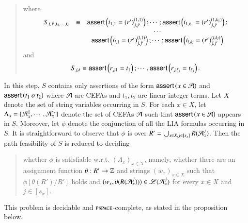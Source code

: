 \begin{quote}
\[\]
where 
\[
\begin{array}{l c c}
S_{j, j', \vec{i_1}, \cdots, \vec{i_l}} & \equiv & \ASSERT{i_{1,1} = (r')^{(1,1)}_{j, j'}}; \cdots; \ASSERT{i_{1,k_1} = (r')^{(1,k_1)}_{j, j'}};\\
& & \cdots\\
 & & \ASSERT{i_{l,1} = (r')^{(l,1)}_{j, j'}}; \cdots; \ASSERT{i_{l,k_l} = (r')^{(l,k_l)}_{j, j'}}
\end{array}
\]
and
\[
\begin{array}{l}
S_{j, \vec{t}} \equiv \ASSERT{r_{j, 1} = t_1}; \cdots, \ASSERT{r_{j, \ell_j} = t_{\ell_j}}.
\end{array}
\]
%
\end{quote}

\medskip
{}%

\smallskip

In this step, $S$ %
contains only assertions of the form $\textsf{assert}\left(x \in \mathcal{A}\right)$ and  $\textsf{assert}\left(t_1\ o\ t_2\right)$  where $\mathcal{A}$ are CEFAs and $t_1, t_2$ are linear integer terms. %
%
Let $X$ denote the set of string variables occurring in $S$.
For each $x \in X$, let $\Lambda_x=\{\mathcal{A}_{x}^1, \cdots, \mathcal{A}_{x}^{s_x}\}$ denote the set of CEFAs $\mathcal{A}$ such that $\textsf{assert}\left(x \in \mathcal{A}\right)$ appears in $S$. 
Moreover, let $\phi$ denote the conjunction of all the LIA formulas occurring in $S$. It is straightforward to observe that $\phi$ is over %
$R'=\bigcup_{x\in X, j \in [s_x]}R(\mathcal{A}_{x}^{j})$. Then the path feasibility of $S$ is reduced to deciding 
\begin{quote}
whether $\phi$ is satisfiable w.r.t. $(\Lambda_x)_{x \in X}$, namely,  %
%	
whether %
there are an assignment function $\theta: R' \rightarrow \mathbb{Z}$ and strings $(w_x)_{x \in X}$ such that  $\phi[\theta(R')/R']$ holds and $(w_x, \theta(R(\mathcal{A}_{x}^{j}))) \in \mathscr{L}(\mathcal{A}_{x}^{j})$ for every $x \in X$ and $j \in [s_x]$.
\end{quote}
This problem is decidable and $\textsc{pspace}$-complete, as stated in the proposition below.

